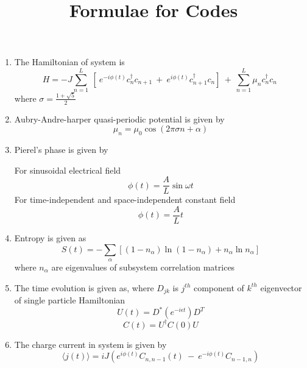 \documentclass[a4paper, oneside,10pt]{article}
\newcommand{\eq}[2]{\begin{equation} \label{eq:#1} #2 \end{equation}}
\begin{document}
\title{Formulae for Codes}
\maketitle
\begin{enumerate}
\item The Hamiltonian of system is 
\eq{}{H = -J\sum_{n=1}^L \ [\ e^{-i\phi(t)} c_n^\dagger c_{n+1} \ + \ e^{i\phi(t)} c_{n+1}^\dagger c_n ] \ + \ \sum_{n=1}^L \mu_n c_n^\dagger c_n \ }
where $\sigma = \frac{1+\sqrt{5}}{2}$
\item Aubry-Andre-harper quasi-periodic potential is given by
\eq{}{\mu_n = \mu_0 \cos{(2\pi\sigma n + \alpha)} }

\item Pierel's phase is given by

\subitem For sinusoidal electrical field
\eq{}{\phi(t) = \frac{A}{L}\sin{\omega t} }
\subitem For time-independent and space-independent constant field
\eq{}{\phi(t) = \frac{A}{L}t}
\item Entropy is given as 
\eq{}{S(t) = -\sum_\alpha[(1-n_\alpha)\ln{(1-n_\alpha)} + n_\alpha \ln{n_\alpha}]}
where $n_\alpha$ are eigenvalues of subsystem correlation matrices
\item The time evolution is given as, where $D_{jk}$ is $j^{th}$ component of $k^{th}$ eigenvector of single particle Hamiltonian
\eq{}{U(t) = D^*(e^{-i\epsilon t})D^T}
\eq{}{C(t) = U^\dagger C(0) U}
\item The charge current in system is given by
\eq{}{\langle j(t) \rangle = iJ(e^{i\phi(t)}C_{n,n-1}(t) \ - \ e^{-i\phi (t)}C_{n-1,n})}
\end{enumerate}
\end{document}
